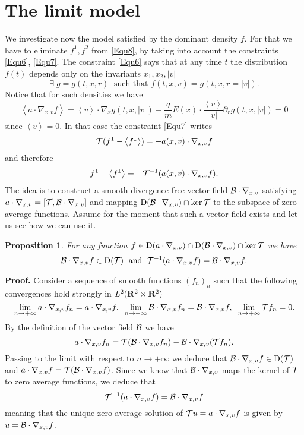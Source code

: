 \documentclass[12pt, a4paper]{article}
\providecommand\mathbb{\bf}
\newcommand\R{{\mathbb R}}
\newtheorem{pro}{Proposition}[section]
\newcounter{steps}
\newenvironment{proof}[1][]{%
\par\medbreak\setcounter{steps}{0}
{\noindent\bfseries Proof#1. }} {\hfill\fbox{\ }\medbreak}
\newcommand{\fo}[0]{
f ^1}
\newcommand{\ltxv}[0]{
L^2(\R ^2 \times \R ^2)}
\newcommand{\nxv}[0]{
\nabla_{x,v}}
\newcommand{\limn}[0]{
\lim _{n \to +\infty}}
\newcommand{\ave}[1]{
\left \langle #1 \right \rangle }
\newcommand{\D}[0]{
\mathrm{D}}
\begin{document}
\section{The limit model}
\label{LimMod}
We investigate now the model satisfied by the dominant density $f$. For that we have to eliminate $\fo, f^2$ from \eqref{Equ8}, by taking into account the constraints \eqref{Equ6}, \eqref{Equ7}. The constraint \eqref{Equ6} says that at any time $t$ the distribution $f(t)$ depends only on the invariants $x_1, x_2, |v|$
\[
\exists \;g = g(t,x,r)\;\mbox{ such that } f(t,x,v) = g(t,x,r = |v|).
\]
Notice that for such densities we have
\begin{equation}
\label{Equ34} \ave{a \cdot \nxv f} = \ave{v} \cdot \nabla _x g (t,x,|v|) + \frac{q}{m} E(x) \cdot \frac{\ave{v}}{|v|} \partial _r g (t,x,|v|) = 0
\end{equation}
since $\ave{v} = 0$. In that case the constraint \eqref{Equ7} writes
\[
{\cal T}(\fo - \ave{\fo} ) = - a(x,v) \cdot \nxv f
\]
and therefore 
\begin{equation}
\label{Equ35} \fo - \ave{\fo} = - {\cal T} ^{-1} (a(x,v) \cdot \nxv f).
\end{equation}
The idea is to construct a smooth divergence free vector field ${\cal B} \cdot \nxv $ satisfying $a \cdot \nxv = [{\cal T}, {\cal B} \cdot \nxv ]$ and mapping $\D({\cal B} \cdot \nxv ) \cap \ker {\cal T}$  to the subspace of zero average functions. Assume for the moment that such a vector field exists and let us see how we can use it.
\begin{pro}
\label{Step2} For any function $f \in \D(a \cdot \nxv) \cap \D ( {\cal B} \cdot \nxv ) \cap \ker {\cal T}$ we have
\[
{\cal B} \cdot \nxv f \in \D ({\cal T})\;\mbox{ and } \; 
{\cal T} ^{-1} (a \cdot \nxv f ) = {\cal B} \cdot \nxv f.
\]
\end{pro}
\begin{proof}
Consider a sequence of smooth functions $(f_n)_n$ such that the following convergences hold strongly in $\ltxv{}$
\[
\limn a\cdot \nxv f_n = a \cdot \nxv f,\;\;\limn {\cal B} \cdot \nxv f_n = {\cal B} \cdot \nxv f,\;\;\limn {\cal T} f_n = 0.
\]
By the definition of the vector field ${\cal B}$ we have
\[
a \cdot \nxv f_n = {\cal T} ( {\cal B} \cdot \nxv f_n) - {\cal B} \cdot \nxv ( {\cal T} f_n).
\]
Passing to the limit with respect to $n \to +\infty$ we deduce that ${\cal B} \cdot \nxv f \in \D({\cal T})$ and $a \cdot \nxv f = {\cal T} ({\cal B} \cdot \nxv f)$. Since we know that ${\cal B} \cdot \nxv $ maps the kernel of ${\cal T}$ to zero average functions, we deduce that
\[
{\cal T} ^{-1} (a \cdot \nxv f ) = {\cal B} \cdot \nxv f
\]
meaning that the unique zero average solution of ${\cal T} u = a \cdot \nxv f$ is given by $u = {\cal B} \cdot \nxv f$.  

\end{proof}
\end{document}
